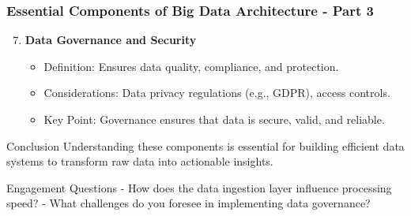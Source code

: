 \documentclass[aspectratio=169]{beamer}
\begin{document}
\begin{frame}[fragile]
    \frametitle{Essential Components of Big Data Architecture - Part 3}
    \begin{enumerate}
        \setcounter{enumi}{6} %
        \item \textbf{Data Governance and Security}
            \begin{itemize}
                \item Definition: Ensures data quality, compliance, and protection.
                \item Considerations: Data privacy regulations (e.g., GDPR), access controls.
                \item Key Point: Governance ensures that data is secure, valid, and reliable.
            \end{itemize}
    \end{enumerate}
    
    \begin{block}{Conclusion}
        Understanding these components is essential for building efficient data systems to transform raw data into actionable insights.
    \end{block}
    
    \begin{block}{Engagement Questions}
        - How does the data ingestion layer influence processing speed?
        - What challenges do you foresee in implementing data governance?
    \end{block}
\end{frame}
\end{document}
